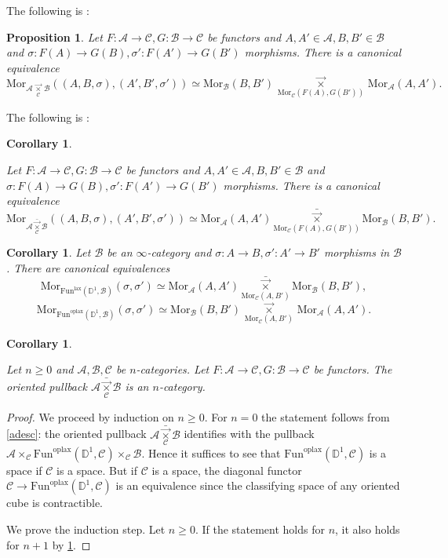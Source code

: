 \documentclass[10pt,oneside]{article}
\numberwithin{equation}{section} %
\numberwithin{figure}{section} %
\theoremstyle{plain}
\newtheorem{proposition}[theorem]{Proposition}
\newtheorem{corollary}[theorem]{Corollary}
\theoremstyle{definition}
\newcommand{\bD}{{\mathbb D}}
\newcommand{\mA}{{\mathcal A}}
\newcommand{\mB}{{\mathcal B}}
\newcommand{\mC}{{\mathcal C}}
\newcommand{\A}{A}
\newcommand{\B}{B}
\newcommand{\F}{{F}}
\newcommand{\G}{{G}}
\newcommand{\Fun}{\mathrm{Fun}}
\newcommand{\lax}{{\mathrm{lax}}}
\newcommand{\oplax}{{\mathrm{oplax}}}
\newcommand{\Mor}{{\mathrm{Mor}}}
\begin{document}
The following is \cite[Proposition 3.8.12.]{oriented}:

\begin{proposition}\label{homs} 
Let $\F: \mA \to \mC,\G: \mB \to \mC$ be functors and $\A,\A'\in \mA, \B,\B' \in \mB$ and $\sigma: \F(\A)\to \G(\B), \sigma': \F(\A')\to \G(\B')$ morphisms. There is a canonical equivalence $$\Mor_{{\mA \,\underset{\mC}{\vec{\times}}}\, \mB}((\A,\B, \sigma),(\A',\B', \sigma')) \simeq {\Mor_\mB(\B,\B') \,\underset{\Mor_\mC(\F(\A),\G(\B'))}{\vec{\times}}}\, \Mor_{\mA}(\A,\A').$$

\end{proposition}

The following is \cite[Corollary 3.8.13.]{oriented}:

\begin{corollary}\label{homso}

Let $\F: \mA \to \mC,\G: \mB \to \mC$ be functors and $\A,\A'\in \mA, \B,\B' \in \mB$ and $\sigma: \F(\A)\to \G(\B), \sigma': \F(\A')\to \G(\B')$ morphisms. There is a canonical equivalence $$\Mor_{\mA\underset{\mC}{\bar{\vec{\times}}} \mB}((\A,\B, \sigma),(\A',\B', \sigma')) \simeq \Mor_\mA(\A,\A')\underset{\Mor_\mC(\F(\A),\G(\B'))}{\bar{\vec{\times}}} \Mor_\mB(\B,\B').$$

\end{corollary}

\begin{corollary}\label{homs2}\label{homso2} Let $\mB$ be an $\infty$-category and $\sigma: \A \to \B, \sigma': \A' \to \B'$ morphisms in $\mB$. There are canonical equivalences $$\Mor_{\Fun^\lax(\bD^1,\mB)}(\sigma, \sigma') \simeq \Mor_\mA(\A,\A')\underset{\Mor_\mC(\A,\B')}{\bar{\vec{\times}}} \Mor_\mB(\B,\B'), $$
$$\Mor_{\Fun^\oplax(\bD^1,\mB)}(\sigma, \sigma') \simeq {\Mor_\mB(\B,\B') \,\underset{\Mor_\mC(\A,\B')}{\vec{\times}}}\, \Mor_{\mA}(\A,\A'). $$\end{corollary}

\begin{corollary}\label{dimensio}

Let $ n \geq 0$ and $\mA,\mB,\mC$ be $n$-categories.
Let $\F: \mA \to \mC,\G: \mB \to \mC$ be functors.
The oriented pullback $\mA\underset{\mC}{\bar{\vec{\times}}} \mB$
is an $n$-category.
    
\end{corollary}

\begin{proof}

We proceed by induction on $n \geq 0.$
For $n=0$ the statement follows from \cref{adesc}:
the oriented pullback $\mA\underset{\mC}{\bar{\vec{\times}}} \mB$ identifies with the pullback $\mA \times_\mC \Fun^\oplax(\bD^1,\mC) \times_\mC \mB$.
Hence it suffices to see that $\Fun^\oplax(\bD^1,\mC)$ is a space if
$\mC$ is a space. But if $\mC$ is a space, the diagonal functor
$\mC \to \Fun^\oplax(\bD^1,\mC)$ is an equivalence since the classifying space of any oriented cube is contractible.

We prove the induction step. Let $ n \geq 0.$
If the statement holds for $n$, it also holds for $n+1$ by \cref{homso}.
\end{proof}
\end{document}
